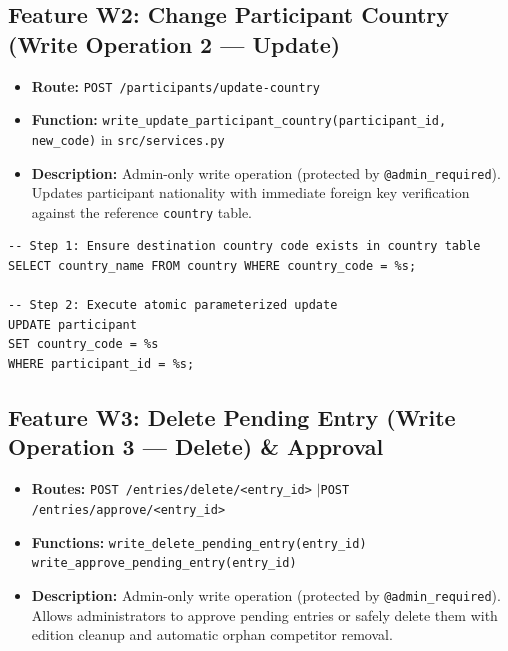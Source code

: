 \documentclass[11pt,a4paper]{article}
\begin{document}
\subsection{Feature W2: Change Participant Country (Write Operation 2 --- Update)}
\begin{itemize}[leftmargin=1.5em, itemsep=0.5pt, topsep=0.5pt]
  \item \textbf{Route:} \texttt{POST /participants/update-country}
  \item \textbf{Function:} \texttt{write\_update\_participant\_country(participant\_id, new\_code)} in \texttt{src/services.py}
  \item \textbf{Description:} Admin-only write operation (protected by \texttt{@admin\_required}). Updates participant nationality with immediate foreign key verification against the reference \texttt{country} table.
\end{itemize}

\begin{lstlisting}
-- Step 1: Ensure destination country code exists in country table
SELECT country_name FROM country WHERE country_code = %s;

-- Step 2: Execute atomic parameterized update
UPDATE participant 
SET country_code = %s 
WHERE participant_id = %s;
\end{lstlisting}

\newpage

\subsection{Feature W3: Delete Pending Entry (Write Operation 3 --- Delete) \& Approval}
\begin{itemize}[leftmargin=1.5em, itemsep=0.5pt, topsep=0.5pt]
  \item \textbf{Routes:} \texttt{POST /entries/delete/<entry\_id>} \quad$\vert$\quad \texttt{POST /entries/approve/<entry\_id>}
  \item \textbf{Functions:} \texttt{write\_delete\_pending\_entry(entry\_id)} \\
        \texttt{write\_approve\_pending\_entry(entry\_id)}
  \item \textbf{Description:} Admin-only write operation (protected by \texttt{@admin\_required}). Allows administrators to approve pending entries or safely delete them with edition cleanup and automatic orphan competitor removal.
\end{itemize}
\end{document}
